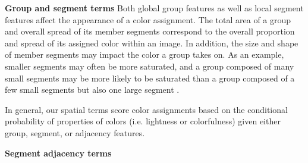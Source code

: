 \textbf{Group and segment terms}
Both global group features as well as local segment features affect the appearance of a color assignment. The total area of a group and overall spread of its member segments correspond to the overall proportion and spread of its assigned color within an image. In addition, the size and shape of member segments may impact the color a group takes on. As an example, smaller segments may often be more saturated, and a group composed of many small segments may be more likely to be saturated than a group composed of a few small segments but also one large segment .   

In general, our spatial terms score color assignments based on the conditional probability of properties of colors (i.e. lightness or colorfulness) given either group, segment, or adjacency features. 



\textbf{Segment adjacency terms}

